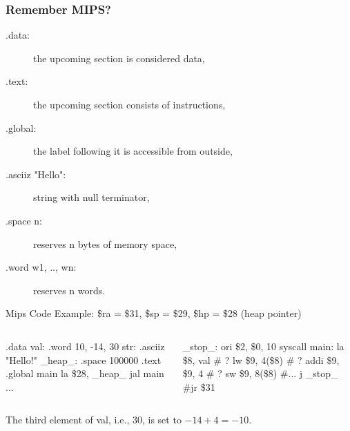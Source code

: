 \documentclass{beamer}
\begin{document}
\begin{frame}[fragile,t]
   \frametitle{Remember MIPS?}

\begin{description}

    \item[.data:] the upcoming section is considered data,\smallskip

    \item[.text:] the upcoming section consists of instructions,\smallskip

    \item[.global:] the label following it is accessible from outside,\smallskip

    \item[.asciiz "Hello":]  string with null terminator,\smallskip

    \item[.space n:] reserves n bytes of memory space,\smallskip

    \item[.word w1, .., wn:] reserves n words.
\end{description}


\begin{block}{Mips Code Example: \$ra = \$31, \$sp = \$29, \$hp = \$28 (heap pointer)}
\begin{columns}
\vspace{-2ex}
\begin{colorcode}[fontsize=\scriptsize]
        .data
val:    .word 10, -14, 30
str:    .asciiz "Hello!"
_heap_: .space 100000
        .text
        .global main
        la \$28, _heap_
        jal main
        ...
\end{colorcode} 
\vspace{-2ex}
\begin{colorcode}[fontsize=\scriptsize]
_stop_:
         ori  \$2, \$0, 10
         syscall
main:
         la   \$8, val    # ?
         lw   \$9, 4(\$8)  # ?
         addi \$9, \$9, 4  # ?
         sw   \$9, 8(\$8)  #...
         j    _stop_     #jr \$31
\end{colorcode}
\end{columns}
\end{block}

\pause
\smallskip

The third element of val, i.e., $30$, is set to $-14 + 4 = -10$.

\end{frame}

\end{document}
